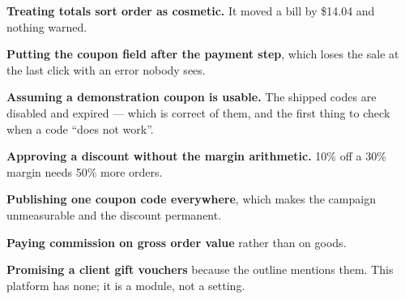 \begin{pitfall}
\begin{tight}
  \item \textbf{Treating totals sort order as cosmetic.} It moved a bill by
        \$14.04 and nothing warned.
  \item \textbf{Putting the coupon field after the payment step}, which loses
        the sale at the last click with an error nobody sees.
  \item \textbf{Assuming a demonstration coupon is usable.} The shipped codes
        are disabled and expired --- which is correct of them, and the first
        thing to check when a code ``does not work''.
  \item \textbf{Approving a discount without the margin arithmetic.} 10\% off a
        30\% margin needs 50\% more orders.
  \item \textbf{Publishing one coupon code everywhere}, which makes the
        campaign unmeasurable and the discount permanent.
  \item \textbf{Paying commission on gross order value} rather than on goods.
  \item \textbf{Promising a client gift vouchers} because the outline mentions
        them. This platform has none; it is a module, not a setting.
\end{tight}
\end{pitfall}

